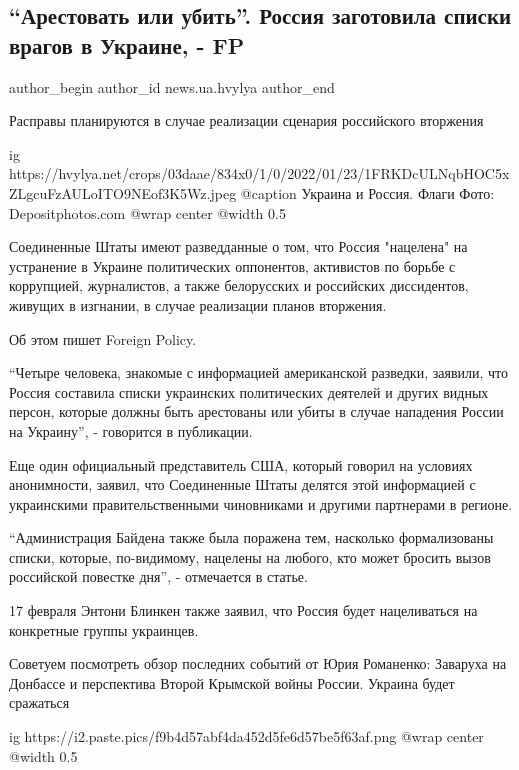  
 
 
 
 
 
\subsection{\enquote{Арестовать или убить}. Россия заготовила списки врагов в Украине, - FP}
\label{sec:18_02_2022.stz.news.ua.hvylya.1.rossia_spiski_vragov}
 
\ifcmt
 author_begin
   author_id news.ua.hvylya
 author_end
\fi

\begin{zznagolos}
Расправы планируются в случае реализации сценария российского вторжения	
\end{zznagolos}

\ifcmt
  ig https://hvylya.net/crops/03daae/834x0/1/0/2022/01/23/1FRKDcULNqbHOC5xZLgcuFzAULoITO9NEof3K5Wz.jpeg
  @caption Украина и Россия. Флаги Фото: Depositphotos.com
  @wrap center
  @width 0.5
\fi

Соединенные Штаты имеют разведданные о том, что Россия "нацелена" на устранение
в Украине политических оппонентов, активистов по борьбе с коррупцией,
журналистов, а также белорусских и российских диссидентов, живущих в изгнании,
в случае реализации планов вторжения.

Об этом пишет Foreign Policy.

\enquote{Четыре человека, знакомые с информацией американской разведки, заявили, что
Россия составила списки украинских политических деятелей и других видных
персон, которые должны быть арестованы или убиты в случае нападения России на
Украину}, - говорится в публикации.

Еще один официальный представитель США, который говорил на условиях
анонимности, заявил, что Соединенные Штаты делятся этой информацией с
украинскими правительственными чиновниками и другими партнерами в регионе.

\enquote{Администрация Байдена также была поражена тем, насколько формализованы списки,
которые, по-видимому, нацелены на любого, кто может бросить вызов российской
повестке дня}, - отмечается в статье.

17 февраля Энтони Блинкен также заявил, что Россия будет нацеливаться на
конкретные группы украинцев.

Советуем посмотреть обзор последних событий от Юрия Романенко: Заваруха на
Донбассе и перспектива Второй Крымской войны России. Украина будет сражаться

\ifcmt
  ig https://i2.paste.pics/f9b4d57abf4da452d5fe6d57be5f63af.png
  @wrap center
  @width 0.5
\fi
